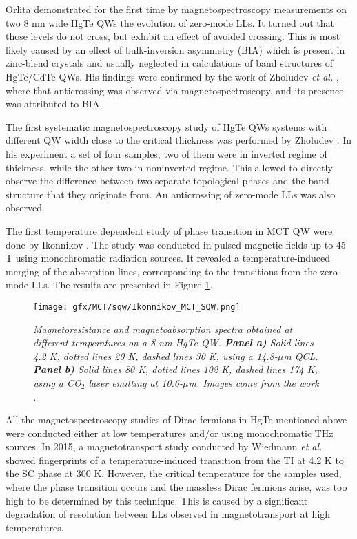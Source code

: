 \documentclass[titlepage,a4paper]{book}
\begin{document}
Orlita \cite{Orlita_MCT_QW} demonstrated for the first time by magnetospectroscopy measurements on two 8 nm wide HgTe QWs the evolution of zero-mode LLs. It turned out that those levels do not cross, but exhibit an effect of avoided crossing. This is most likely caused by an effect of bulk-inversion asymmetry (BIA) which is present in zinc-blend crystals and usually neglected in calculations of band structures of HgTe/CdTe QWs. His findings were confirmed by the work of Zholudev \textit{et al.} \cite{Zholudev_MCT_QW_anticrossing}, where that anticrossing was observed via magnetospectroscopy, and its presence was attributed to BIA.

The first systematic magnetospectroscopy study of HgTe QWs systems with different QW width close to the critical thickness was performed by Zholudev \cite{Zholudev_MCT_QW}. In his experiment a set of four samples, two of them were in inverted regime of thickness, while the other two in noninverted regime. This allowed to directly observe the difference between two separate topological phases and the band structure that they originate from. An anticrossing of zero-mode LLs was also observed.

The first temperature dependent study of phase transition in MCT QW were done by Ikonnikov \cite{Ikonnikov_MCT_SQW}. The study was conducted in pulsed magnetic fields up to 45 T using monochromatic radiation sources. It revealed a temperature-induced merging of the absorption lines, corresponding to the transitions from the zero-mode LLs. The results are presented in Figure \ref{fig:Ikonnikov_MCT_SQW}.

\begin{figure}[H]
	\centering
	\texttt{[image: gfx/MCT/sqw/Ikonnikov\_MCT\_SQW.png]}
	\vspace{-10pt}
	\caption{\textit{Magnetoresistance and magnetoabsorption spectra obtained at different temperatures on a 8-nm HgTe QW. \textbf{Panel a)} Solid lines 4.2 K, dotted lines 20 K, dashed lines 30 K, using a 14.8-$\mu$m QCL. \textbf{Panel b)} Solid lines 80 K, dotted lines 102 K, dashed lines 174 K, using a CO$_2$ laser emitting at 10.6-$\mu$m. Images come from the work \cite{Ikonnikov_MCT_SQW}.}}
	\label{fig:Ikonnikov_MCT_SQW}
\end{figure}

All the magnetospectroscopy studies of Dirac fermions in HgTe mentioned above were conducted either at low temperatures and/or using monochromatic THz sources. In 2015, a magnetotransport study conducted by Wiedmann \textit{et al.} \cite{Wiedmann_State} showed fingerprints of a temperature-induced transition from the TI at 4.2 K to the SC phase at 300 K. However, the critical temperature for the samples used, where the phase transition occurs and the massless Dirac fermions arise, was too high to be determined by this technique. This is caused by a significant degradation of resolution between LLs observed in magnetotransport at high temperatures.
\end{document}
